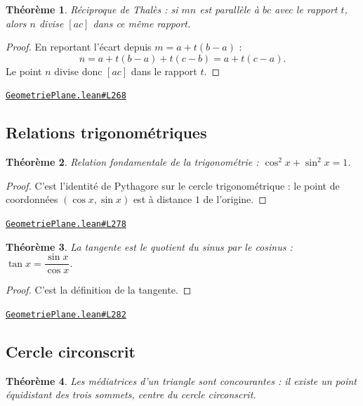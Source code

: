 \documentclass[11pt,a4paper]{article}
\theoremstyle{definition}
\theoremstyle{plain}
\newtheorem{theoreme}{Théorème}
\newcommand{\source}[2]{\par\smallskip\noindent\hfill{\footnotesize\href{#1}{\texttt{#2}}}\par\smallskip}
\begin{document}
\begin{theoreme}
Réciproque de Thalès : si $mn$ est parallèle à $bc$ avec le rapport $t$, alors $n$
divise $[ac]$ dans ce même rapport.
\end{theoreme}

\begin{proof}
En reportant l'écart depuis $m = a + t(b-a)$ :
\[ n = a + t(b-a) + t(c-b) = a + t(c-a) . \]
Le point $n$ divise donc $[ac]$ dans le rapport $t$.
\end{proof}
\source{https://github.com/Commutator-IO/learn-lean/blob/main/cours/01-college/02-geometrie-plane/GeometriePlane.lean\#L268}{GeometriePlane.lean\#L268}

\subsection{Relations trigonométriques}

\begin{theoreme}
Relation fondamentale de la trigonométrie : $\cos^2 x + \sin^2 x = 1$.
\end{theoreme}

\begin{proof}
C'est l'identité de Pythagore sur le cercle trigonométrique : le point de coordonnées
$(\cos x, \sin x)$ est à distance $1$ de l'origine.
\end{proof}
\source{https://github.com/Commutator-IO/learn-lean/blob/main/cours/01-college/02-geometrie-plane/GeometriePlane.lean\#L278}{GeometriePlane.lean\#L278}

\begin{theoreme}
La tangente est le quotient du sinus par le cosinus : $\tan x = \dfrac{\sin x}{\cos x}$.
\end{theoreme}

\begin{proof}
C'est la définition de la tangente.
\end{proof}
\source{https://github.com/Commutator-IO/learn-lean/blob/main/cours/01-college/02-geometrie-plane/GeometriePlane.lean\#L282}{GeometriePlane.lean\#L282}

\subsection{Cercle circonscrit}

\begin{theoreme}
Les médiatrices d'un triangle sont concourantes : il existe un point équidistant des
trois sommets, centre du cercle circonscrit.
\end{theoreme}
\end{document}
